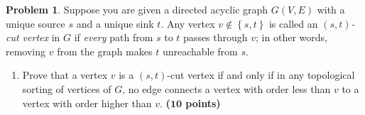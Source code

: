 \documentclass{article}
\theoremstyle{definition}
\newtheorem{problem}{Problem}
\newcommand{\grade}[1]{\hfill{\textbf{($\mathbf{#1}$ points)}}}
\newcommand{\set}[1]{\ensuremath{\left\{ #1 \right\}}}
\begin{document}
\smallskip

\begin{problem}
	Suppose you are given a directed acyclic graph $G(V,E)$ with a unique source $s$ and a unique sink $t$. Any vertex $v \notin \set{s,t}$ is called an \emph{$(s,t)$-cut vertex} in $G$ if \emph{every} path from $s$ to $t$ passes through 
	$v$; in other words, removing $v$ from the graph makes $t$ unreachable from $s$. 
	
		\begin{enumerate}[label=(\alph*)]
		\item Prove that a vertex $v$ is a $(s,t)$-cut vertex if and only if in any topological sorting of vertices of $G$, no edge connects a vertex with order less than $v$ to a vertex with order higher than $v$. \grade{10}
		
	\smallskip
		

\end{enumerate}
\end{problem}
\end{document}

